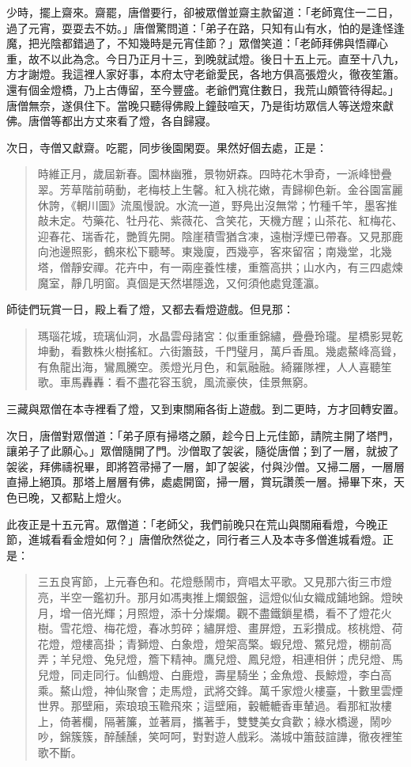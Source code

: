 少時，擺上齋來。齋罷，唐僧要行，卻被眾僧並齋主款留道：「老師寬住一二日，過了元宵，耍耍去不妨。」唐僧驚問道：「弟子在路，只知有山有水，怕的是逢怪逢魔，把光陰都錯過了，不知幾時是元宵佳節？」眾僧笑道：「老師拜佛與悟禪心重，故不以此為念。今日乃正月十三，到晚就試燈。後日十五上元。直至十八九，方才謝燈。我這裡人家好事，本府太守老爺愛民，各地方俱高張燈火，徹夜笙簫。還有個金燈橋，乃上古傳留，至今豐盛。老爺們寬住數日，我荒山頗管待得起。」唐僧無奈，遂俱住下。當晚只聽得佛殿上鐘鼓喧天，乃是街坊眾信人等送燈來獻佛。唐僧等都出方丈來看了燈，各自歸寢。

次日，寺僧又獻齋。吃罷，同步後園閑耍。果然好個去處，正是：
\begin{quote}
時維正月，歲屆新春。園林幽雅，景物妍森。四時花木爭奇，一派峰巒疊翠。芳草階前萌動，老梅枝上生馨。紅入桃花嫩，青歸柳色新。金谷園富麗休誇，《輞川圖》流風慢說。水流一道，野鳧出沒無常；竹種千竿，墨客推敲未定。芍藥花、牡丹花、紫薇花、含笑花，天機方醒；山茶花、紅梅花、迎春花、瑞香花，艷質先開。陰崖積雪猶含凍，遠樹浮煙已帶春。又見那鹿向池邊照影，鶴來松下聽琴。東幾廈，西幾亭，客來留宿；南幾堂，北幾塔，僧靜安禪。花卉中，有一兩座養性樓，重簷高拱；山水內，有三四處煉魔室，靜几明窗。真個是天然堪隱逸，又何須他處覓蓬瀛。
\end{quote}

師徒們玩賞一日，殿上看了燈，又都去看燈遊戲。但見那：
\begin{quote}
瑪瑙花城，琉璃仙洞，水晶雲母諸宮：似重重錦繡，疊疊玲瓏。星橋影晃乾坤動，看數株火樹搖紅。六街簫鼓，千門璧月，萬戶香風。幾處鰲峰高聳，有魚龍出海，鸞鳳騰空。羨燈光月色，和氣融融。綺羅隊裡，人人喜聽笙歌。車馬轟轟：看不盡花容玉貌，風流豪俠，佳景無窮。
\end{quote}

三藏與眾僧在本寺裡看了燈，又到東關廂各街上遊戲。到二更時，方才回轉安置。

次日，唐僧對眾僧道：「弟子原有掃塔之願，趁今日上元佳節，請院主開了塔門，讓弟子了此願心。」眾僧隨開了門。沙僧取了袈裟，隨從唐僧；到了一層，就披了袈裟，拜佛禱祝畢，即將笤帚掃了一層，卸了袈裟，付與沙僧。又掃二層，一層層直掃上絕頂。那塔上層層有佛，處處開窗，掃一層，賞玩讚羨一層。掃畢下來，天色已晚，又都點上燈火。

此夜正是十五元宵。眾僧道：「老師父，我們前晚只在荒山與關廂看燈，今晚正節，進城看看金燈如何？」唐僧欣然從之，同行者三人及本寺多僧進城看燈。正是：
\begin{quote}
三五良宵節，上元春色和。花燈懸鬧市，齊唱太平歌。又見那六街三市燈亮，半空一鑑初升。那月如馮夷推上爛銀盤，這燈似仙女織成鋪地錦。燈映月，增一倍光輝；月照燈，添十分燦爛。觀不盡鐵鎖星橋，看不了燈花火樹。雪花燈、梅花燈，春冰剪碎；繡屏燈、畫屏燈，五彩攢成。核桃燈、荷花燈，燈樓高掛；青獅燈、白象燈，燈架高檠。蝦兒燈、鱉兒燈，棚前高弄；羊兒燈、兔兒燈，簷下精神。鷹兒燈、鳳兒燈，相連相併；虎兒燈、馬兒燈，同走同行。仙鶴燈、白鹿燈，壽星騎坐；金魚燈、長鯨燈，李白高乘。鰲山燈，神仙聚會；走馬燈，武將交鋒。萬千家燈火樓臺，十數里雲煙世界。那壁廂，索琅琅玉韂飛來；這壁廂，轂轆轆香車輦過。看那紅妝樓上，倚著欄，隔著簾，並著肩，攜著手，雙雙美女貪歡；綠水橋邊，鬧吵吵，錦簇簇，醉醺醺，笑呵呵，對對遊人戲彩。滿城中簫鼓諠譁，徹夜裡笙歌不斷。
\end{quote}

